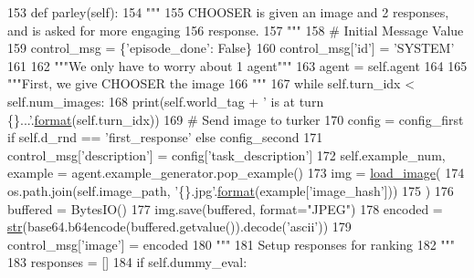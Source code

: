 \begin{DoxyCode}
153     \textcolor{keyword}{def }parley(self):
154         \textcolor{stringliteral}{"""}
155 \textcolor{stringliteral}{        CHOOSER is given an image and 2 responses, and is asked for more engaging}
156 \textcolor{stringliteral}{        response.}
157 \textcolor{stringliteral}{        """}
158         \textcolor{comment}{# Initial Message Value}
159         control\_msg = \{\textcolor{stringliteral}{'episode\_done'}: \textcolor{keyword}{False}\}
160         control\_msg[\textcolor{stringliteral}{'id'}] = \textcolor{stringliteral}{'SYSTEM'}
161 
162         \textcolor{stringliteral}{"""We only have to worry about 1 agent"""}
163         agent = self.agent
164 
165         \textcolor{stringliteral}{"""First, we give CHOOSER the image}
166 \textcolor{stringliteral}{        """}
167         \textcolor{keywordflow}{while} self.turn\_idx < self.num\_images:
168             print(self.world\_tag + \textcolor{stringliteral}{' is at turn \{\}...'}.\hyperlink{namespaceparlai_1_1chat__service_1_1services_1_1messenger_1_1shared__utils_a32e2e2022b824fbaf80c747160b52a76}{format}(self.turn\_idx))
169             \textcolor{comment}{# Send image to turker}
170             config = config\_first \textcolor{keywordflow}{if} self.d\_rnd == \textcolor{stringliteral}{'first\_response'} \textcolor{keywordflow}{else} config\_second
171             control\_msg[\textcolor{stringliteral}{'description'}] = config[\textcolor{stringliteral}{'task\_description'}]
172             self.example\_num, example = agent.example\_generator.pop\_example()
173             img = \hyperlink{namespacepersonality__captions_1_1worlds_a2863737d97a8e8c5a1ebe9029d0d2293}{load\_image}(
174                 os.path.join(self.image\_path, \textcolor{stringliteral}{'\{\}.jpg'}.\hyperlink{namespaceparlai_1_1chat__service_1_1services_1_1messenger_1_1shared__utils_a32e2e2022b824fbaf80c747160b52a76}{format}(example[\textcolor{stringliteral}{'image\_hash'}]))
175             )
176             buffered = BytesIO()
177             img.save(buffered, format=\textcolor{stringliteral}{"JPEG"})
178             encoded = \hyperlink{namespacegenerate__task__READMEs_a5b88452ffb87b78c8c85ececebafc09f}{str}(base64.b64encode(buffered.getvalue()).decode(\textcolor{stringliteral}{'ascii'}))
179             control\_msg[\textcolor{stringliteral}{'image'}] = encoded
180             \textcolor{stringliteral}{"""}
181 \textcolor{stringliteral}{                Setup responses for ranking}
182 \textcolor{stringliteral}{            """}
183             responses = []
184             \textcolor{keywordflow}{if} self.dummy\_eval:

\end{DoxyCode}
